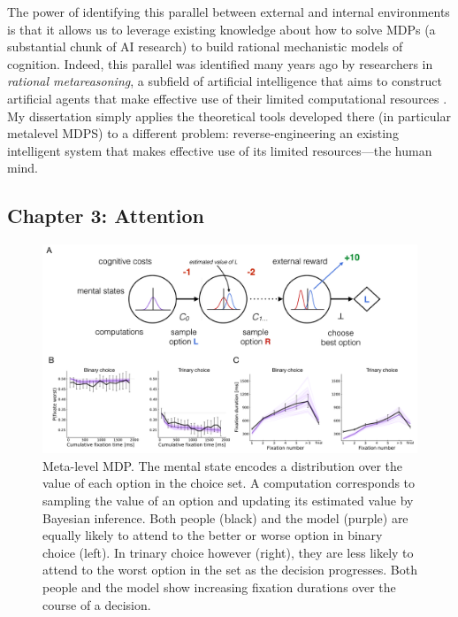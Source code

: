 \documentclass[11pt,a4paperpaper,]{article}
\begin{document}
The power of identifying this parallel between external and internal environments is that it allows us to leverage existing knowledge about how to solve MDPs (a substantial chunk of AI research) to build rational mechanistic models of cognition. Indeed, this parallel was identified many years ago by researchers in \emph{rational metareasoning}, a subfield of artificial intelligence that aims to construct artificial agents that make effective use of their limited computational resources \citep{russell1991principles,hay2016principles}. My dissertation simply applies the theoretical tools developed there (in particular metalevel MDPS) to a different problem: reverse-engineering an existing intelligent system that makes effective use of its limited resources---the human mind.

\subsection{Chapter 3: Attention}

\begin{figure}[th]
  \centering
  \includegraphics[width=\textwidth]{diagrams/precis/attention.pdf}
  \caption{
     Meta-level MDP. The mental state encodes a distribution over the value of each option in the choice set. A computation corresponds to sampling the value of an option and updating its estimated value by Bayesian inference.
     Both people (black) and the model (purple) are equally likely to attend to the better or worse option in binary choice (left). In trinary choice however (right), they are less likely to attend to the worst option in the set as the decision progresses.
     Both people and the model show increasing fixation durations over the course of a decision.
  }
  \label{fig:attention}
\end{figure}
\end{document}
